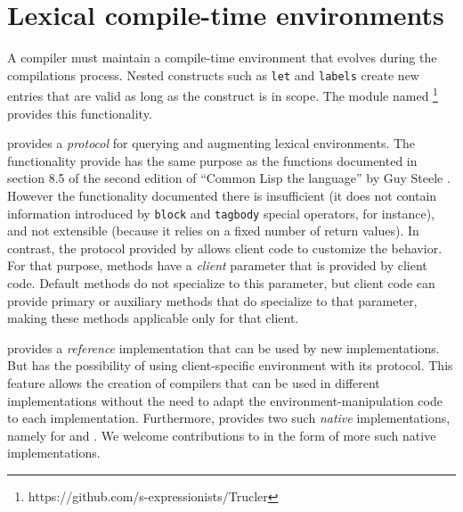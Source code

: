 \chapter{Lexical compile-time environments}
\label{chap-lexical-compile-time-environments}

A \commonlisp{} compiler must maintain a compile-time environment that
evolves during the compilations process.  Nested constructs such as
\texttt{let} and \texttt{labels} create new entries that are valid as
long as the construct is in scope. The module named \trucler{}%
\footnote{https://github.com/s-expressionists/Trucler} provides this
functionality.

\trucler{} provides a \clos{} \emph{protocol} for querying and
augmenting lexical environments.  The functionality provide has the
same purpose as the functions documented in section 8.5 of the second
edition of ``Common Lisp the language'' by Guy Steele
\cite{Steele:1990:CLL:95411}.  However the functionality documented
there is insufficient (it does not contain information introduced by
\texttt{block} and \texttt{tagbody} special operators, for instance),
and not extensible (because it relies on a fixed number of return
values).  In contrast, the protocol provided by \trucler{} allows
client code to customize the behavior.  For that purpose, \trucler{}
methods have a \emph{client} parameter that is provided by client
code.  Default \trucler{} methods do not specialize to this parameter,
but client code can provide primary or auxiliary methods that do
specialize to that parameter, making these methods applicable only for
that client.

\trucler{} provides a \emph{reference} implementation that can be used
by new \commonlisp{} implementations.  But \trucler{} has the
possibility of using client-specific environment with its protocol.
This feature allows the creation of compilers that can be used in
different \commonlisp{} implementations without the need to adapt the
environment-manipulation code to each implementation.  Furthermore,
\trucler{} provides two such \emph{native} implementations, namely for
\sbcl{} and \ccl{}.  We welcome contributions to \trucler{} in the
form of more such native implementations.

